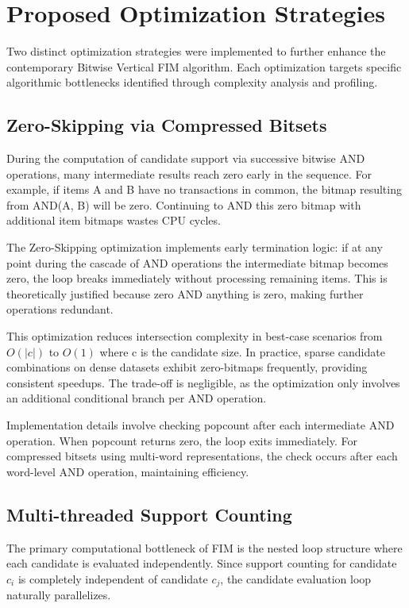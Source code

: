 \documentclass[conference]{IEEEtran}
\begin{document}
\section{Proposed Optimization Strategies}

Two distinct optimization strategies were implemented to further enhance the contemporary Bitwise Vertical FIM algorithm. Each optimization targets specific algorithmic bottlenecks identified through complexity analysis and profiling.

\subsection{Zero-Skipping via Compressed Bitsets}

During the computation of candidate support via successive bitwise AND operations, many intermediate results reach zero early in the sequence. For example, if items A and B have no transactions in common, the bitmap resulting from AND(A, B) will be zero. Continuing to AND this zero bitmap with additional item bitmaps wastes CPU cycles.

The Zero-Skipping optimization implements early termination logic: if at any point during the cascade of AND operations the intermediate bitmap becomes zero, the loop breaks immediately without processing remaining items. This is theoretically justified because zero AND anything is zero, making further operations redundant.

This optimization reduces intersection complexity in best-case scenarios from $O(|c|)$ to $O(1)$ where c is the candidate size. In practice, sparse candidate combinations on dense datasets exhibit zero-bitmaps frequently, providing consistent speedups. The trade-off is negligible, as the optimization only involves an additional conditional branch per AND operation.

Implementation details involve checking popcount after each intermediate AND operation. When popcount returns zero, the loop exits immediately. For compressed bitsets using multi-word representations, the check occurs after each word-level AND operation, maintaining efficiency.

\subsection{Multi-threaded Support Counting}

The primary computational bottleneck of FIM is the nested loop structure where each candidate is evaluated independently. Since support counting for candidate $c_i$ is completely independent of candidate $c_j$, the candidate evaluation loop naturally parallelizes.
\end{document}
